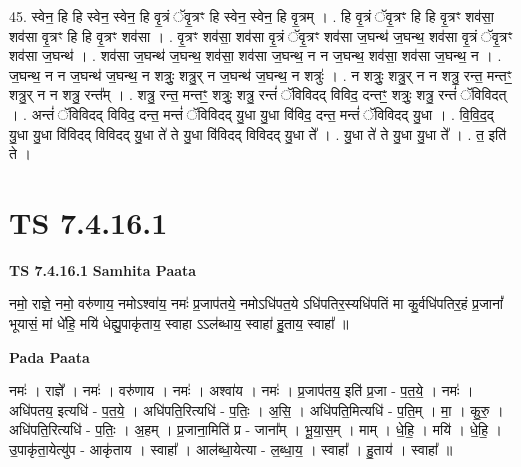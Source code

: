 \documentclass[17pt]{extarticle}
\begin{document}
45. स्वेन॒ हि हि स्वेन॒ स्वेन॒ हि वृ॒त्रं ॅवृ॒त्रꣳ हि स्वेन॒ स्वेन॒ हि वृ॒त्रम् । . हि वृ॒त्रं ॅवृ॒त्रꣳ हि हि वृ॒त्रꣳ शव॑सा॒ शव॑सा वृ॒त्रꣳ हि हि वृ॒त्रꣳ शव॑सा । . वृ॒त्रꣳ शव॑सा॒ शव॑सा वृ॒त्रं ॅवृ॒त्रꣳ शव॑सा ज॒घन्थ॑ ज॒घन्थ॒ शव॑सा वृ॒त्रं ॅवृ॒त्रꣳ शव॑सा ज॒घन्थ॑ । . शव॑सा ज॒घन्थ॑ ज॒घन्थ॒ शव॑सा॒ शव॑सा ज॒घन्थ॒ न न ज॒घन्थ॒ शव॑सा॒ शव॑सा ज॒घन्थ॒ न । . ज॒घन्थ॒ न न ज॒घन्थ॑ ज॒घन्थ॒ न शत्रुः॒ शत्रु॒र् न ज॒घन्थ॑ ज॒घन्थ॒ न शत्रुः॑ । . न शत्रुः॒ शत्रु॒र् न न शत्रु॒ रन्त॒ मन्तꣳ॒॒ शत्रु॒र् न न शत्रु॒ रन्त᳚म् । . शत्रु॒ रन्त॒ मन्तꣳ॒॒ शत्रुः॒ शत्रु॒ रन्तं॑ ॅविविदद् विविद॒ दन्तꣳ॒॒ शत्रुः॒ शत्रु॒ रन्तं॑ ॅविविदत् । . अन्तं॑ ॅविविदद् विविद॒ दन्त॒ मन्तं॑ ॅविविदद् यु॒धा यु॒धा वि॑विद॒ दन्त॒ मन्तं॑ ॅविविदद् यु॒धा । . वि॒वि॒द॒द् यु॒धा यु॒धा वि॑विदद् विविदद् यु॒धा ते॑ ते यु॒धा वि॑विदद् विविदद् यु॒धा ते᳚ । . यु॒धा ते॑ ते यु॒धा यु॒धा ते᳚ । . त॒ इति॑ ते । \newline
\pagebreak
{}

\section{ TS 7.4.16.1 }

\textbf{TS 7.4.16.1 } \newline
\textbf{Samhita Paata} \newline

नमो॒ राज्ञे॒ नमो॒ वरु॑णाय॒ नमोऽश्वा॑य॒ नमः॑ प्र॒जाप॑तये॒ नमोऽधि॑पत॒ये ऽधि॑पतिर॒स्यधि॑पतिं मा कु॒र्वधि॑पतिर॒हं प्र॒जानां᳚ भूयासं॒ मां धे॑हि॒ मयि॑ धेह्यु॒पाकृ॑ताय॒ स्वाहा ऽऽल॑ब्धाय॒ स्वाहा॑ हु॒ताय॒ स्वाहा᳚ ॥ \newline

\textbf{Pada Paata} \newline

नमः॑ । राज्ञे᳚ । नमः॑ । वरु॑णाय । नमः॑ । अश्वा॑य । नमः॑ । प्र॒जाप॑तय॒ इति॑ प्र॒जा - प॒त॒ये॒ । नमः॑ । अधि॑पतय॒ इत्यधि॑ - प॒त॒ये॒ । अधि॑पति॒रित्यधि॑ - प॒तिः॒ । अ॒सि॒ । अधि॑पति॒मित्यधि॑ - प॒ति॒म् । मा॒ । कु॒रु॒ । अधि॑पति॒रित्यधि॑ - प॒तिः॒ । अ॒हम् । प्र॒जाना॒मिति॑ प्र - जाना᳚म् । भू॒या॒स॒म् । माम् । धे॒हि॒ । मयि॑ । धे॒हि॒ । उ॒पाकृ॑ता॒येत्यु॑प - आकृ॑ताय । स्वाहा᳚ । आल॑ब्धा॒येत्या - ल॒ब्धा॒य॒ । स्वाहा᳚ । हु॒ताय॑ । स्वाहा᳚ ॥  \newline
\end{document}
